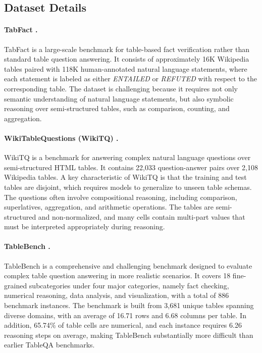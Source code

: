 \documentclass[11pt]{article}
\begin{document}
\subsection{Dataset Details}
\label{sec:a2}
\paragraph{TabFact \citep{2019TabFactA}.}
TabFact is a large-scale benchmark for table-based fact verification rather than standard table question answering. It consists of approximately 16K Wikipedia tables paired with 118K human-annotated natural language statements, where each statement is labeled as either \textit{ENTAILED} or \textit{REFUTED} with respect to the corresponding table. The dataset is challenging because it requires not only semantic understanding of natural language statements, but also symbolic reasoning over semi-structured tables, such as comparison, counting, and aggregation.

\vspace{-4pt}

\paragraph{WikiTableQuestions (WikiTQ) \citep{pasupat2015compositional}.}
WikiTQ is a benchmark for answering complex natural language questions over semi-structured HTML tables. It contains 22,033 question-answer pairs over 2,108 Wikipedia tables. A key characteristic of WikiTQ is that the training and test tables are disjoint, which requires models to generalize to unseen table schemas. The questions often involve compositional reasoning, including comparison, superlatives, aggregation, and arithmetic operations. The tables are semi-structured and non-normalized, and many cells contain multi-part values that must be interpreted appropriately during reasoning.

\vspace{-4pt}

\paragraph{TableBench \citep{wu2025tablebench}.}
TableBench is a comprehensive and challenging benchmark designed to evaluate complex table question answering in more realistic scenarios. It covers 18 fine-grained subcategories under four major categories, namely fact checking, numerical reasoning, data analysis, and visualization, with a total of 886 benchmark instances. The benchmark is built from 3,681 unique tables spanning diverse domains, with an average of 16.71 rows and 6.68 columns per table. In addition, 65.74\% of table cells are numerical, and each instance requires 6.26 reasoning steps on average, making TableBench substantially more difficult than earlier TableQA benchmarks.
\end{document}
